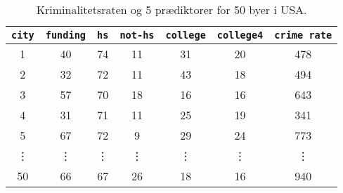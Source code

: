 \begin{table}[H] 
\centering 
\begin{tabular}{c|cccccc} 
\texttt{city} & \texttt{funding} & \texttt{hs} & \texttt{not-hs} & \texttt{college} & \texttt{college4} & \texttt{crime rate} \\
\midrule
1 & 40 & 74 & 11 & 31 & 20 & 478 \\
2 & 32 & 72 & 11 & 43 & 18 & 494 \\
3 & 57 & 70 & 18 & 16 & 16 & 643 \\
4 & 31 & 71 & 11 & 25 & 19 & 341 \\
5 & 67 & 72 & 9 & 29 & 24 & 773 \\
\vdots & \vdots & \vdots & \vdots & \vdots & \vdots & \vdots \\
50 & 66 & 67 & 26 & 18 & 16 & 940 \\
\bottomrule
\end{tabular}  
\caption{Kriminalitetsraten og 5 prædiktorer for 50 byer i USA.} \label{tab:crime} 
\end{table} 